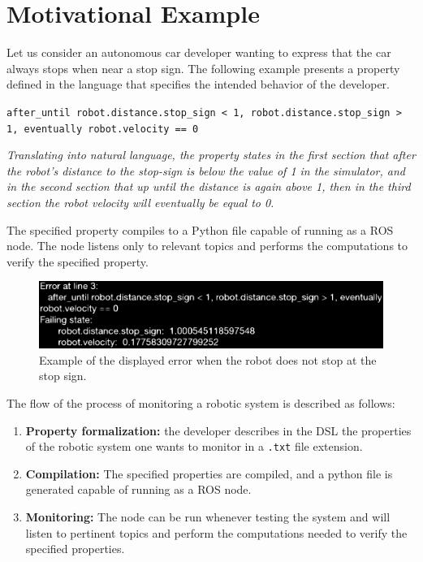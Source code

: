 \chapter{Motivational Example}
\label{chap:motivationalexample}


Let us consider an autonomous car developer wanting to express that the car always stops when near a stop sign. The following example presents a property defined in the language that specifies the intended behavior of the developer.


\texttt{after\_until robot.distance.stop\_sign < 1, robot.distance.stop\_sign > 1, eventually robot.velocity == 0}

\textit{Translating into natural language, the property states in the first section that after the robot's distance to the stop-sign is below the value of 1 in the simulator, and in the second section that up until the distance is again above 1, then in the third section the robot velocity will eventually be equal to 0.}

The specified property compiles to a Python file capable of running as a ROS node. The node listens only to relevant topics and performs the computations to verify the specified property.

\begin{figure}
\includegraphics[width=\textwidth]{images/error.eps}
\caption{Example of the displayed error when the robot does not stop at the stop sign.} \label{fig1}
\end{figure}

The flow of the process of monitoring a robotic system is described as follows:

\begin{enumerate}[label=(\roman*)]
    \item \textbf{Property formalization:} the developer describes in the DSL the properties of the robotic system one wants to monitor in a \texttt{.txt} file extension.
    \item \textbf{Compilation:} The specified properties are compiled, and a python file is generated capable of running as a ROS node.
    \item \textbf{Monitoring:} The node can be run whenever testing the system and will listen to pertinent topics and perform the computations needed to verify the specified properties.
\end{enumerate}